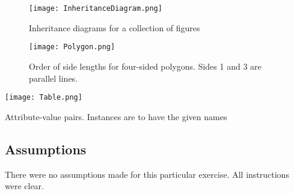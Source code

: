 \documentclass[11pt]{article}
\newcommand{\forceindent}{\leavevmode{\parindent=1em\indent}}
\begin{document}
\begin{figure}[h!]
  \centering
{\texttt{[image: InheritanceDiagram.png]}}
    \caption{Inheritance diagrams for a collection of figures}
\end{figure}

\begin{figure}[h!]
  \centering
{\texttt{[image: Polygon.png]}}
    \caption{Order of side lengths for four-sided polygons. Sides 1 and 3 are parallel lines.}
\end{figure}

\begin{table} [h!]
  \centering
{\texttt{[image: Table.png]}}
    \caption{Attribute-value pairs. Instances are to have the given names}
\end{table}

\subsection{Assumptions}
\forceindent There were no assumptions made for this particular exercise. All instructions were clear.
\end{document}

